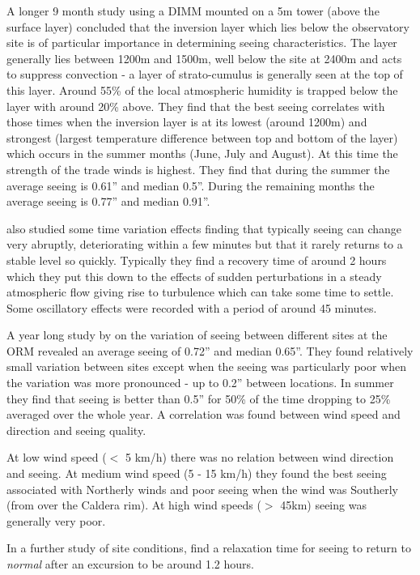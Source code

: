 {{A longer 9 month study \citep{munoz97nighttime} using a DIMM mounted on a 5m tower (above the surface layer) concluded that the inversion layer which lies below the observatory site is of particular importance in determining seeing characteristics. The layer generally lies between 1200m and 1500m, well below the site at 2400m and acts to suppress convection - a layer of strato-cumulus is generally seen at the top of this layer. Around 55\% of the local atmospheric humidity is trapped below the layer with around 20\% above. They find that the best seeing correlates with those times when the inversion layer is at its lowest (around 1200m) and strongest (largest temperature difference between top and bottom of the layer) which occurs in the summer months (June, July and August). At this time the strength of the trade winds is highest. They find that during the summer the average seeing is 0.61'' and median 0.5''. During the remaining months the average seeing is 0.77'' and median 0.91''. 

\citet{munoz97nighttime} also studied some time variation effects finding that typically seeing can change very abruptly, deteriorating within a few minutes but that it rarely returns to a stable level so quickly. Typically they find a recovery time of around 2 hours which they put this down to the effects of sudden perturbations in a steady atmospheric flow giving rise to turbulence which can take some time to settle. Some oscillatory effects were recorded with a period of around 45 minutes. 

A year long study by \citet{munoz98homogeneity} on the variation of seeing between different sites at the ORM revealed an average seeing of 0.72'' and median 0.65''. They found relatively small variation between sites except when the seeing was particularly poor when the variation was more pronounced - up to 0.2'' between locations. In summer they find that seeing is better than 0.5'' for 50\% of the time dropping to 25\% averaged over the whole year. A correlation was found between wind speed and direction and seeing quality. 

At low wind speed ($<$ 5 km/h) there was no relation between wind direction and seeing. At medium wind speed (5 - 15 km/h) they found the best seeing associated with Northerly winds and poor seeing when the wind was Southerly (from over the Caldera rim). At high wind speeds ($>$ 45km) seeing was generally very poor. 

In a further study of site conditions, \citet{vernin98temporal} find a relaxation time for seeing to return to \emph{normal} after an excursion to be around 1.2 hours.

}}
